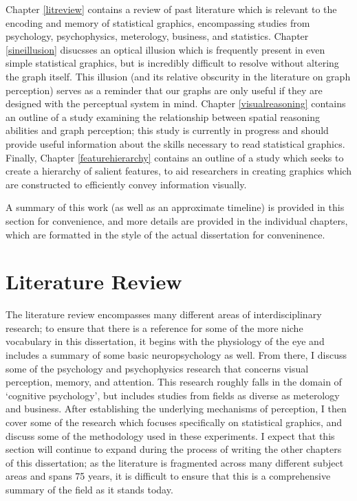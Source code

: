 \documentclass[11pt]{isuthesis}\usepackage[]{graphicx}\usepackage[]{color}
\begin{document}
Chapter \ref{litreview} contains a review of past literature which is relevant to the encoding and memory of statistical graphics, encompassing studies from psychology, psychophysics, meterology, business, and statistics. Chapter \ref{sineillusion} disucsses an optical illusion which is frequently present in even simple statistical graphics, but is incredibly difficult to resolve without altering the graph itself. This illusion (and its relative obscurity in the literature on graph perception) serves as a reminder that our graphs are only useful if they are designed with the perceptual system in mind. Chapter \ref{visualreasoning} contains an outline of a study examining the relationship between spatial reasoning abilities and graph perception; this study is currently in progress and should provide useful information about the skills necessary to read statistical graphics. Finally, Chapter \ref{featurehierarchy} contains an outline of a study which seeks to create a hierarchy of salient features, to aid researchers in creating graphics which are constructed to efficiently convey information visually. 

A summary of this work (as well as an approximate timeline) is provided in this section for convenience, and more details are provided in the individual chapters, which are formatted in the style of the actual dissertation for conveninence. 

\section{Literature Review}
The literature review encompasses many different areas of interdisciplinary research; to ensure that there is a reference for some of the more niche vocabulary in this dissertation, it begins with the physiology of the eye and includes a summary of some basic neuropsychology as well. From there, I discuss some of the psychology and psychophysics research that concerns visual perception, memory, and attention. This research roughly falls in the domain of `cognitive psychology', but includes studies from fields as diverse as meterology and business. After establishing the underlying mechanisms of perception, I then cover some of the research which focuses specifically on statistical graphics, and discuss some of the methodology used in these experiments. I expect that this section will continue to expand during the process of writing the other chapters of this dissertation; as the literature is fragmented across many different subject areas and spans 75 years, it is difficult to ensure that this is a comprehensive summary of the field as it stands today. 
\end{document}
